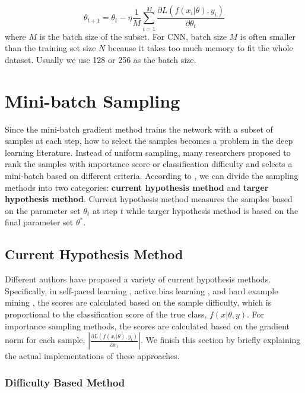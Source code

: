 \begin{equation}
	\theta_{t+1} = \theta_t - \eta \frac{1}{M} \sum_{i=1}^{M}
 \frac{\partial{L(f(x_i|\theta), y_i)}}{\partial{\theta_t}}
\end{equation}
where $M$ is the batch size of the subset. For CNN, batch size $M$ is often smaller than the training set size $N$ because it takes too much memory to fit the whole dataset. Usually we use 128 or 256 as the batch size. 

\section{Mini-batch Sampling}
Since the mini-batch gradient method trains the network with a subset of samples at each step, how to select the samples becomes a problem in the deep learning literature. Instead of uniform sampling, many researchers proposed to rank the samples with importance score or classification difficulty and selects a mini-batch based on different criteria. According to \cite{Hacohen2019a}, we can divide the sampling methods into two categories: \textbf{current hypothesis method} and \textbf{targer hypothesis method}. Current hypothesis method measures the samples based on the parameter set $\theta_t$ at step $t$ while targer hypothesis method is based on the final parameter set $\theta^*$. 

\subsection{Current Hypothesis Method}
Different authors have proposed a variety of current hypothesis methods. Specifically, in self-paced learning \cite{Kumar2010, Li2017, Meng2016}, active bias learning \cite{Chang2017}, and hard example mining \cite{Shrivastava2016, Loshchilov2015}, the scores are calculated based on the sample difficulty, which is proportional to the classification score of the true class, $f(x|\theta, y)$. For importance sampling methods, the scores are calculated based on the gradient norm for each sample, $|\frac{\partial{L(f(x_i|\theta), y_i)}}{\partial{x_i}}|$. We finish this section by briefly explaining the actual implementations of these approaches.

\subsubsection{Difficulty Based Method}

